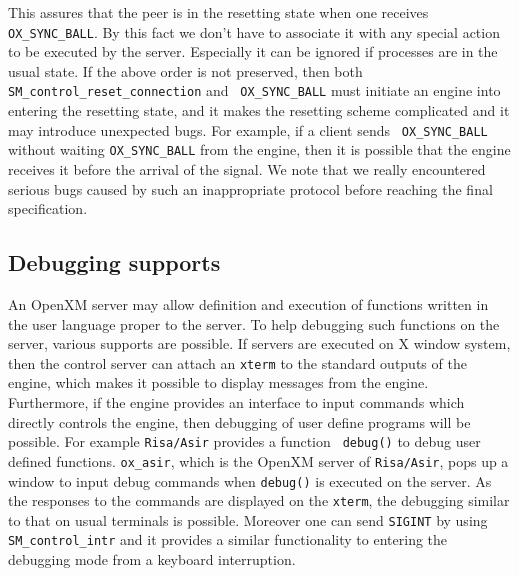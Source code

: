 This assures that the peer is in the resetting state when one receives
{\tt OX\_SYNC\_BALL}. By this fact we don't have to associate it with
any special action to be executed by the server. Especially it can be
ignored if processes are in the usual state. If the above order is not
preserved, then both {\tt SM\_control\_reset\_connection} and {\tt
OX\_SYNC\_BALL} must initiate an engine into entering the resetting
state, and it makes the resetting scheme complicated and it may
introduce unexpected bugs. For example, if a client sends {\tt
OX\_SYNC\_BALL} without waiting {\tt OX\_SYNC\_BALL} from the engine,
then it is possible that the engine receives it before the arrival of
the signal. We note that we really encountered serious bugs caused
by such an inappropriate protocol before reaching the final specification.

\subsection{Debugging supports}
An OpenXM server may allow definition and execution of functions
written in the user language proper to the server.  To help debugging
such functions on the server, various supports are possible. If
servers are executed on X window system, then the control server can
attach an {\tt xterm} to the standard outputs of the engine, which
makes it possible to display messages from the engine. Furthermore, if
the engine provides an interface to input commands which directly
controls the engine, then debugging of user define programs will be
possible. For example {\tt Risa/Asir} provides a function {\tt
debug()} to debug user defined functions. {\tt ox\_asir}, which is
the OpenXM server of {\tt Risa/Asir}, pops up a window to input
debug commands when {\tt debug()} is executed on the server.
As the responses to the commands are displayed on the {\tt xterm},
the debugging similar to that on usual terminals is possible.
Moreover one can send {\tt SIGINT} by using {\tt SM\_control\_intr}
and it provides a similar functionality to entering the debugging
mode from a keyboard interruption.
